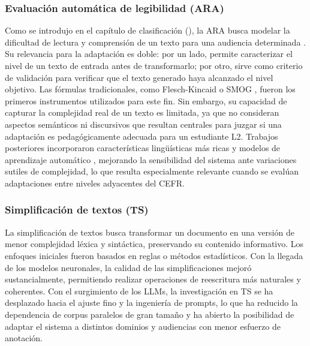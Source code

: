 \subsubsection*{Evaluación automática de legibilidad (ARA)}
Como se introdujo en el capítulo de clasificación (), la ARA busca modelar la dificultad de lectura y comprensión de un texto para una audiencia determinada \parencite{Feng2010}. Su relevancia para la adaptación es doble: por un lado, permite caracterizar el nivel de un texto de entrada antes de transformarlo; por otro, sirve como criterio de validación para verificar que el texto generado haya alcanzado el nivel objetivo.
Las fórmulas tradicionales, como Flesch-Kincaid \parencite{Kincaid1975} o SMOG \parencite{smog}, fueron los primeros instrumentos utilizados para este fin. Sin embargo, su capacidad de capturar la complejidad real de un texto es limitada, ya que no consideran aspectos semánticos ni discursivos que resultan centrales para juzgar si una adaptación es pedagógicamente adecuada para un estudiante L2. Trabajos posteriores incorporaron características lingüísticas más ricas y modelos de aprendizaje automático \parencite{Xia2019}, mejorando la sensibilidad del sistema ante variaciones sutiles de complejidad, lo que resulta especialmente relevante cuando se evalúan adaptaciones entre niveles adyacentes del CEFR.
\subsubsection*{Simplificación de textos (TS)}
La simplificación de textos busca transformar un documento en una versión de menor complejidad léxica y sintáctica, preservando su contenido informativo. Los enfoques iniciales fueron basados en reglas o métodos estadísticos. Con la llegada de los modelos neuronales, la calidad de las simplificaciones mejoró sustancialmente, permitiendo realizar operaciones de reescritura más naturales y coherentes.
Con el surgimiento de los LLMs, la investigación en TS se ha desplazado hacia el ajuste fino y la ingeniería de prompts, lo que ha reducido la dependencia de corpus paralelos de gran tamaño y ha abierto la posibilidad de adaptar el sistema a distintos dominios y audiencias con menor esfuerzo de anotación.

